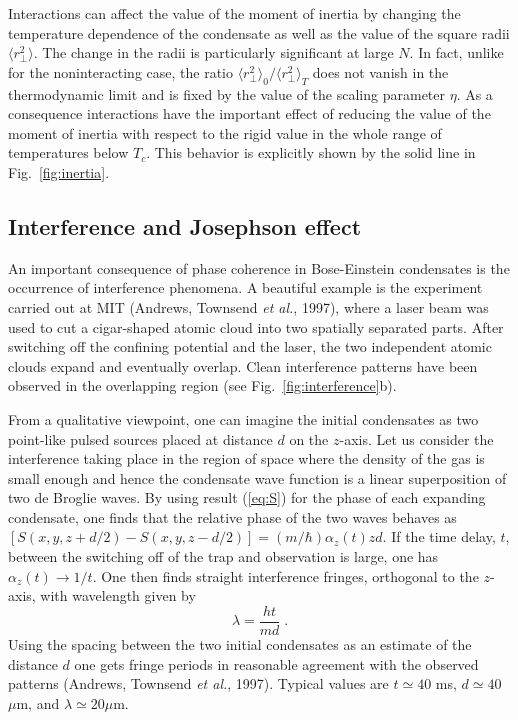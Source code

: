 Interactions can affect the value of the moment of inertia by changing
the temperature dependence of the condensate as well as the value of the
square radii $\langle r_\perp^2 \rangle$. The change in the radii
is particularly significant at large $N$. In fact, unlike for
the noninteracting case, the ratio $\langle r_\perp^2\rangle_0/\langle
r_\perp^2\rangle_{T}$ does not vanish in the thermodynamic limit and is
fixed by the value of the scaling parameter $\eta$. As a consequence
interactions have the important effect of reducing the value of the
moment of inertia with respect to the rigid value in the whole range
of temperatures below $T_c$. This behavior is explicitly shown by the
solid line in Fig.~\ref{fig:inertia}.


\subsection{Interference and Josephson effect}
\label{sec:interference}

An important consequence of phase coherence in Bose-Einstein
condensates  is the occurrence of interference phenomena.
A beautiful example is the experiment carried out at MIT (Andrews, 
Townsend {\it et al.}, 1997), where a laser beam was used to
cut a cigar-shaped atomic cloud into two spatially separated parts.
After switching off the confining potential and the laser, the two
independent atomic clouds expand and eventually overlap. Clean
interference patterns have been observed in the overlapping
region (see Fig.~\ref{fig:interference}b).

\par From a qualitative viewpoint, one can imagine the initial
condensates as two point-like pulsed sources placed at distance $d$
on the $z$-axis. Let us consider the interference taking place in the 
region of space where the density of the gas is small enough and hence
the condensate wave function is a linear superposition of two de Broglie 
waves. By using result (\ref{eq:S}) for the phase of each expanding 
condensate, one finds that the relative phase of the two waves
behaves as $[S(x,y,z+d/2)-S(x,y,z-d/2)]=(m/\hbar) \alpha_z(t) zd$. If the 
time delay, $t$, between the switching off of the trap and observation is
large, one has $\alpha_z(t) \to 1/t$. One then finds straight interference
fringes, orthogonal to the $z$-axis, with wavelength given by 
\begin{equation}
\lambda = \frac{h t}{md} \; .
\label{eq:frin}
\end{equation}
Using the spacing between the two  initial condensates as an estimate of 
the distance $d$ one gets  fringe periods in reasonable agreement with the 
observed patterns (Andrews, Townsend {\it et al.}, 1997). Typical
values are $t\simeq 40$ ms, $d \simeq 40$ $\mu$m, and
$\lambda \simeq 20 \mu$m.


